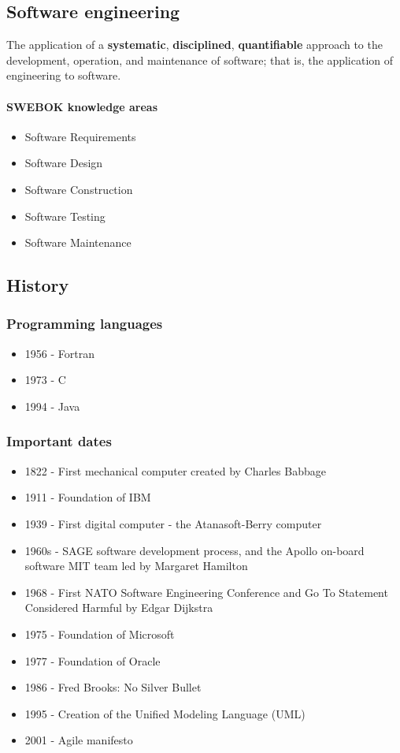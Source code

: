 \documentclass[../ESOF_notes.tex]{subfiles}
\begin{document}
\subsection{Software engineering}

The application of a \textbf{systematic}, \textbf{disciplined},
\textbf{quantifiable} approach to the development, operation, and
maintenance of software; that is, the application of
engineering to software.

\paragraph{SWEBOK knowledge areas}

\begin{itemize}
    \item Software Requirements
    \item Software Design
    \item Software Construction
    \item Software Testing
    \item Software Maintenance
\end{itemize}

\subsection{History}

\subsubsection{Programming languages}

\begin{itemize}
    \item 1956 - Fortran
    \item 1973 - C
    \item 1994 - Java
\end{itemize}


\subsubsection{Important dates}
\begin{itemize}
    \item 1822 - First mechanical computer created by Charles Babbage
    \item 1911 - Foundation of IBM
    \item 1939 - First digital computer - the Atanasoft-Berry computer
    \item 1960s - SAGE software development process, and the Apollo on-board software MIT team led by Margaret Hamilton
    \item 1968 - First NATO Software Engineering Conference and Go To Statement Considered Harmful by Edgar Dijkstra
    \item 1975 - Foundation of Microsoft
    \item 1977 - Foundation of Oracle
    \item 1986 - Fred Brooks: No Silver Bullet
    \item 1995 - Creation of the Unified Modeling Language (UML)
    \item 2001 - Agile manifesto
\end{itemize}
\end{document}
